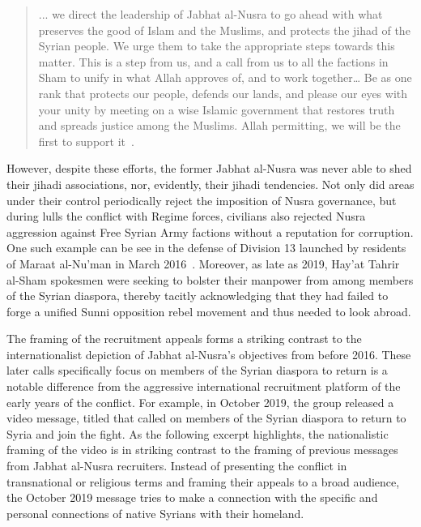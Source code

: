 \begin{quote}
... we direct the leadership of Jabhat al-Nusra to go ahead with what preserves the good of Islam and the Muslims, and protects the jihad of the Syrian people. We urge them to take the appropriate steps towards this matter. This is a step from us, and a call from us to all the factions in Sham to unify in what Allah approves of, and to work together… Be as one rank that protects our people, defends our lands, and please our eyes with your unity by meeting on a wise Islamic government that restores truth and spreads justice among the Muslims. Allah permitting, we will be the first to support it~\autocite{jabhatfs2016deputy}.\end{quote}

However, despite these efforts, the former Jabhat al-Nusra was never able to shed their jihadi associations, nor, evidently, their jihadi tendencies. Not only did areas under their control periodically reject the imposition of Nusra governance, but during lulls the conflict with Regime forces, civilians also rejected Nusra aggression against Free Syrian Army factions without a reputation for corruption. One such example can be see in the defense of Division 13 launched by residents of Maraat al-Nu’man in March 2016~\autocite{cambanis2016syrian}. Moreover, as late as 2019, Hay'at Tahrir al-Sham spokesmen were seeking to bolster their manpower from among members of the Syrian diaspora, thereby tacitly acknowledging that they had failed to forge a unified Sunni opposition rebel movement and thus needed to look abroad. 

The framing of the recruitment appeals forms a striking contrast to the internationalist depiction of Jabhat al-Nusra's objectives from before 2016. These later calls specifically focus on members of the Syrian diaspora to return is a notable difference from the aggressive international recruitment platform of the early years of the conflict. For example, in October 2019, the group released a video message, titled  that called on members of the Syrian diaspora to return to Syria and join the fight.  As the following excerpt highlights, the nationalistic framing of the video is in striking contrast to the framing of previous messages from Jabhat al-Nusra recruiters.  Instead of presenting the conflict in transnational or religious terms and framing their appeals to a broad audience, the October 2019 message tries to make a connection with the specific and personal connections of native Syrians with their homeland. 

